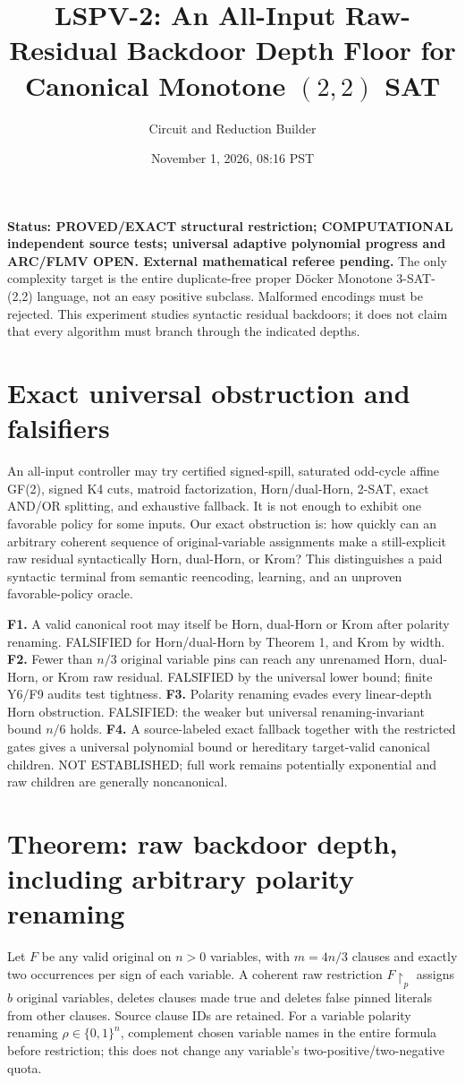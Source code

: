 \documentclass[11pt]{article}
\title{LSPV-2: An All-Input Raw-Residual Backdoor Depth Floor for Canonical Monotone $(2,2)$ SAT}
\author{Circuit and Reduction Builder}
\date{November 1, 2026, 08:16 PST}
\begin{document}
\maketitle
\noindent\textbf{Status: PROVED/EXACT structural restriction; COMPUTATIONAL independent source tests; universal adaptive polynomial progress and ARC/FLMV OPEN. External mathematical referee pending.} The only complexity target is the entire duplicate-free proper D\"ocker Monotone 3-SAT-(2,2) language, not an easy positive subclass. Malformed encodings must be rejected. This experiment studies syntactic residual backdoors; it does not claim that every algorithm must branch through the indicated depths.

\section{Exact universal obstruction and falsifiers}
An all-input controller may try certified signed-spill, saturated odd-cycle affine GF(2), signed K4 cuts, matroid factorization, Horn/dual-Horn, 2-SAT, exact AND/OR splitting, and exhaustive fallback. It is not enough to exhibit one favorable policy for some inputs. Our exact obstruction is: how quickly can an arbitrary coherent sequence of original-variable assignments make a still-explicit raw residual syntactically Horn, dual-Horn, or Krom? This distinguishes a paid syntactic terminal from semantic reencoding, learning, and an unproven favorable-policy oracle.

\noindent\textbf{F1.} A valid canonical root may itself be Horn, dual-Horn or Krom after polarity renaming. FALSIFIED for Horn/dual-Horn by Theorem 1, and Krom by width. \textbf{F2.} Fewer than $n/3$ original variable pins can reach any unrenamed Horn, dual-Horn, or Krom raw residual. FALSIFIED by the universal lower bound; finite Y6/F9 audits test tightness. \textbf{F3.} Polarity renaming evades every linear-depth Horn obstruction. FALSIFIED: the weaker but universal renaming-invariant bound $n/6$ holds. \textbf{F4.} A source-labeled exact fallback together with the restricted gates gives a universal polynomial bound or hereditary target-valid canonical children. NOT ESTABLISHED; full work remains potentially exponential and raw children are generally noncanonical.

\section{Theorem: raw backdoor depth, including arbitrary polarity renaming}
Let $F$ be any valid original on $n>0$ variables, with $m=4n/3$ clauses and exactly two occurrences per sign of each variable. A coherent raw restriction $F\upharpoonright_p$ assigns $b$ original variables, deletes clauses made true and deletes false pinned literals from other clauses. Source clause IDs are retained. For a variable polarity renaming $\rho\in\{0,1\}^n$, complement chosen variable names in the entire formula before restriction; this does not change any variable's two-positive/two-negative quota.
\end{document}
